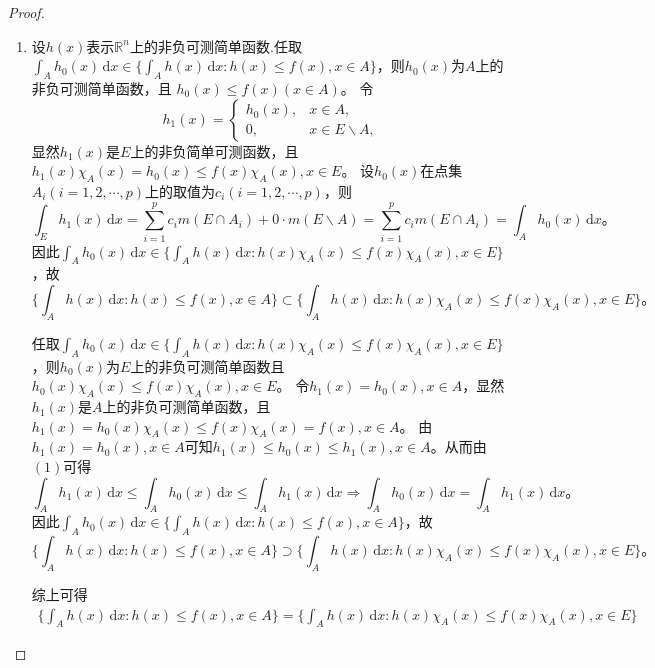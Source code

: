 \documentclass[../../main.tex]{subfiles}
\begin{document}
\begin{proof}
\begin{enumerate}[(1)]
\item 设$h(x)$表示$\mathbb{R}^n$上的非负可测简单函数.任取$\int_A h_0(x)\,\mathrm{d}x \in \{\int_A h(x)\,\mathrm{d}x : h(x) \leqslant f(x), x \in A\}$，则$h_0(x)$为$A$上的非负可测简单函数，且
$h_0(x) \leqslant f(x) (x\in A)$。
令
\[
h_1(x) = 
\begin{cases} 
h_0(x), & x \in A, \\
0, & x \in E\backslash A,
\end{cases}
\]
显然$h_1(x)$是$E$上的非负简单可测函数，且
$h_1(x) \chi_A(x) = h_0(x) \leqslant f(x) \chi_A(x), x \in E$。
设$h_0(x)$在点集$A_i (i = 1,2,\cdots,p)$上的取值为$c_i (i = 1,2,\cdots,p)$，则
\[
\int_E h_1(x)\,\mathrm{d}x = \sum_{i=1}^p c_i m(E \cap A_i) + 0 \cdot m(E\backslash A) = \sum_{i=1}^p c_i m(E \cap A_i) = \int_A h_0(x)\,\mathrm{d}x。
\]
因此$\int_A h_0(x)\,\mathrm{d}x \in \{\int_A h(x)\,\mathrm{d}x : h(x) \chi_A(x) \leqslant f(x) \chi_A(x), x \in E\}$，故
\[
\{\int_A h(x)\,\mathrm{d}x : h(x) \leqslant f(x), x \in A\} \subset \{\int_A h(x)\,\mathrm{d}x : h(x) \chi_A(x) \leqslant f(x) \chi_A(x), x \in E\}。
\]

任取$\int_A h_0(x)\,\mathrm{d}x \in \{\int_A h(x)\,\mathrm{d}x : h(x) \chi_A(x) \leqslant f(x) \chi_A(x), x \in E\}$，则$h_0(x)$为$E$上的非负可测简单函数且
$h_0(x) \chi_A(x) \leqslant f(x) \chi_A(x), x \in E$。
令$h_1(x) = h_0(x), x \in A$，显然$h_1(x)$是$A$上的非负可测简单函数，且
$h_1(x) = h_0(x) \chi_A(x) \leqslant f(x) \chi_A(x) = f(x), x \in A$。
由$h_1(x) = h_0(x), x \in A$可知$h_1(x) \leqslant h_0(x) \leqslant h_1(x), x \in A$。从而由$(1)$可得
\[
\int_A h_1(x)\,\mathrm{d}x \leqslant \int_A h_0(x)\,\mathrm{d}x \leqslant \int_A h_1(x)\,\mathrm{d}x \Rightarrow \int_A h_0(x)\,\mathrm{d}x = \int_A h_1(x)\,\mathrm{d}x。
\]
因此$\int_A h_0(x)\,\mathrm{d}x \in \{\int_A h(x)\,\mathrm{d}x : h(x) \leqslant f(x), x \in A\}$，故
\[
\{\int_A h(x)\,\mathrm{d}x : h(x) \leqslant f(x), x \in A\} \supset \{\int_A h(x)\,\mathrm{d}x : h(x) \chi_A(x) \leqslant f(x) \chi_A(x), x \in E\}。
\]

综上可得
\begin{align}
\{\int_A h(x)\,\mathrm{d}x : h(x) \leqslant f(x), x \in A\} = \{\int_A h(x)\,\mathrm{d}x : h(x) \chi_A(x) \leqslant f(x) \chi_A(x), x \in E\}\label{equation:100.79}
\end{align}


\end{enumerate}
\end{proof}
\end{document}
